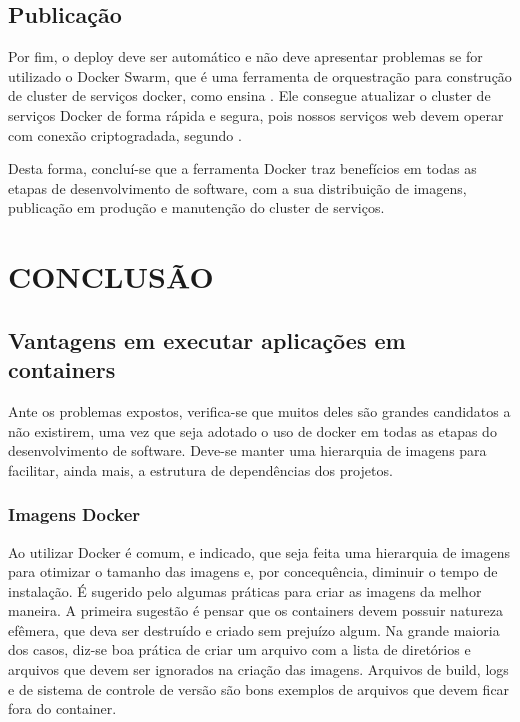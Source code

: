 \documentclass[
	12pt,				%
	openright,			%
	oneside,			%
	a4paper,			%
	chapter=TITLE,		%
	section=TITLE,		%
	english,			%
	french,				%
	spanish,			%
	brazil				%
	]{abntex2}
\begin{document}
\section{Publicação}

Por fim, o deploy deve ser automático e não deve apresentar problemas se for utilizado o Docker Swarm, que é uma ferramenta de orquestração para construção de cluster de serviços docker, como ensina . Ele consegue atualizar o cluster de serviços Docker de forma rápida e segura, pois nossos serviços web devem operar com conexão criptogradada, segundo .

Desta forma, concluí-se que a ferramenta Docker traz benefícios em todas as etapas de desenvolvimento de software, com a sua distribuição de imagens, publicação em produção e manutenção do cluster de serviços.

\chapter{CONCLUSÃO}

\section{Vantagens em executar aplicações em containers}

Ante os problemas expostos, verifica-se que muitos deles são grandes candidatos a não existirem, uma vez que seja adotado o uso de docker em todas as etapas do desenvolvimento de software. Deve-se manter uma hierarquia de imagens para facilitar, ainda mais, a estrutura de dependências dos projetos.

\subsection{Imagens Docker}

Ao utilizar Docker é comum, e indicado, que seja feita uma hierarquia de imagens para otimizar o tamanho das imagens e, por concequência, diminuir o tempo de instalação. É sugerido pelo  algumas práticas para criar as imagens da melhor maneira. A primeira sugestão é pensar que os containers devem possuir natureza efêmera, que deva ser destruído e criado sem prejuízo algum. Na grande maioria dos casos, diz-se boa prática de criar um arquivo com a lista de diretórios e arquivos que devem ser ignorados na criação das imagens. Arquivos de build, logs e de sistema de controle de versão são bons exemplos de arquivos que devem ficar fora do container.
\end{document}
